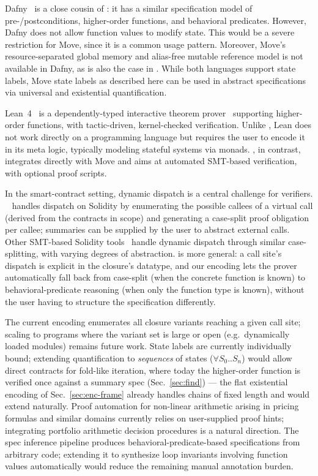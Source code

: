 Dafny~\cite{DAFNY} is a close cousin of \MVP: it has a similar specification model of pre-/postconditions, higher-order functions, and behavioral predicates.
However, Dafny does not allow function values to modify state.
This would be a severe restriction for Move, since it is a common usage pattern.
Moreover, Move's resource-separated global memory and alias-free mutable reference model is not available in Dafny, as is also the case in \fstar.
While both languages support state labels, Move state labels as described here can be used in abstract specifications via universal and existential quantification.

Lean~4~\cite{lean4} is a dependently-typed interactive theorem prover~\cite{Isabelle, COQ} supporting higher-order functions, with tactic-driven, kernel-checked verification.
Unlike \MVP, Lean does not work directly on a programming language but requires the user to encode it in its meta logic, typically modeling stateful systems via monads.
\MVP, in contrast, integrates directly with Move and aims at automated SMT-based verification, with optional proof scripts.

In the smart-contract setting, dynamic dispatch is a central challenge for \solidity verifiers.
\certora~\cite{certora} handles dispatch on Solidity by enumerating the possible callees of a virtual call (derived from the contracts in scope) and generating a case-split proof obligation per callee; summaries can be supplied by the user to abstract external calls.
Other SMT-based Solidity tools~\cite{smtalt18,solcverify,DBLP:conf/esop/HajduJ20} handle dynamic dispatch through similar case-splitting, with varying degrees of abstraction.
\MVP is more general: a call site's dispatch is explicit in the closure's datatype, and our encoding lets the prover automatically fall back from case-split (when the concrete function is known) to behavioral-predicate reasoning (when only the function type is known), without the user having to structure the specification differently.


The current encoding enumerates all closure variants reaching a given call site; scaling to programs where the variant set is large or open (e.g.\ dynamically loaded modules) remains future work.
State labels are currently individually bound; extending quantification to \emph{sequences} of states ($\forall S_0..S_n$) would allow direct contracts for fold-like iteration, where today the higher-order function is verified once against a summary spec (Sec.~\ref{sec:find}) --- the flat existential encoding of Sec.~\ref{sec:enc-frame} already handles chains of fixed length and would extend naturally.
Proof automation for non-linear arithmetic arising in pricing formulas and similar domains currently relies on user-supplied proof hints; integrating portfolio arithmetic decision procedures is a natural direction.
The spec inference pipeline produces behavioral-predicate-based specifications from arbitrary code; extending it to synthesize loop invariants involving function values automatically would reduce the remaining manual annotation burden.

